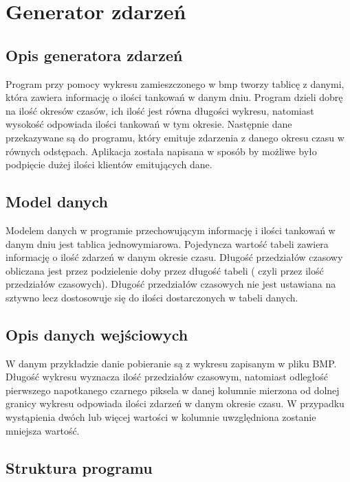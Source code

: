 \newpage
\section{Generator zdarzeń}
\label{sec:eventgenerator}

\subsection{Opis generatora zdarzeń}
\label{sec:eventgenerator-intro}

Program przy pomocy wykresu zamieszczonego w bmp tworzy tablicę z danymi, która zawiera informację o ilości tankowań w danym dniu. Program dzieli dobrę na ilość okresów czasów, ich ilość jest równa długości wykresu, natomiast wysokość odpowiada ilości tankowań w tym okresie. Następnie dane przekazywane są do programu, który emituje zdarzenia z danego okresu czasu w równych odstępach. Aplikacja została napisana w sposób by możliwe było podpięcie dużej ilości klientów emitujących dane. 

\subsection{Model danych}

Modelem danych w programie przechowującym informację i ilości tankowań w danym dniu jest tablica jednowymiarowa. Pojedyncza wartość tabeli zawiera informację o ilość zdarzeń w danym okresie czasu. Długość przedziałów czasowy obliczana jest przez podzielenie doby przez długość tabeli ( czyli przez ilość przedziałów czasowych). Długość przedziałów czasowych nie jest ustawiana na sztywno lecz dostosowuje się do ilości dostarczonych w tabeli danych. 

\subsection{Opis danych wejściowych}

W danym przykładzie danie pobieranie są z wykresu zapisanym w pliku BMP. Długość wykresu wyznacza ilość przedziałów czasowym, natomiast odległość pierwszego napotkanego czarnego piksela w danej kolumnie mierzona od dolnej granicy wykresu odpowiada  ilości zdarzeń w danym okresie czasu. W przypadku wystąpienia dwóch lub więcej wartości w kolumnie uwzględniona zostanie mniejsza wartość.

\subsection{Struktura programu}
